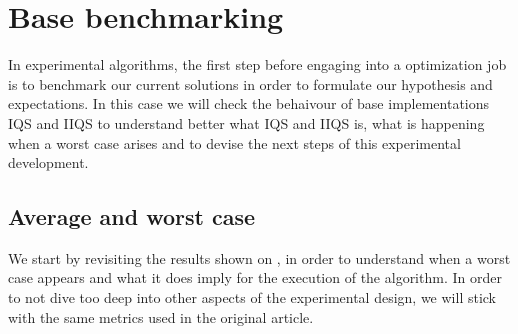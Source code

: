 \section{Base benchmarking}
In experimental algorithms, the first step before engaging into a optimization job is to benchmark our current solutions in order to formulate our hypothesis and expectations. In this case we will check the behaivour of base implementations IQS and IIQS to understand better what IQS and IIQS is, what is happening when a worst case arises and to devise the next steps of this experimental development.

\subsection{Average and worst case}
\label{SUBSECTION:BASE_BENCHMARK__AVERAGE_WORST}

We start by revisiting the results shown on \cite{7416566}, in order to understand when a worst case appears and what it does imply for the execution of the algorithm. In order to not dive too deep into other aspects of the experimental design, we will stick with the same metrics used in the original article.

